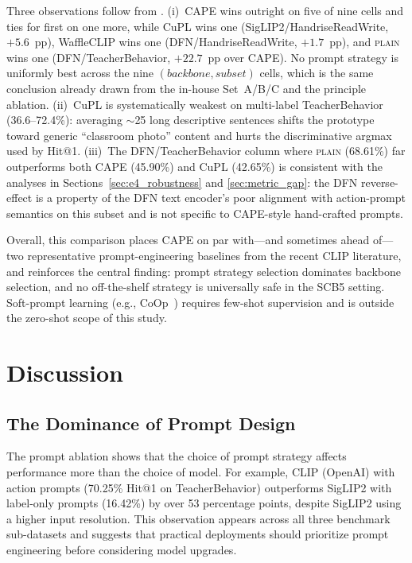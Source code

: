 \documentclass[electronics,article,submit,pdftex,moreauthors]{Definitions/mdpi}
\begin{document}
Three observations follow from . (i)~CAPE wins outright on five of nine cells and ties for first on one more, while CuPL wins one (SigLIP2/HandriseReadWrite, $+5.6$~pp), WaffleCLIP wins one (DFN/HandriseReadWrite, $+1.7$~pp), and \textsc{plain} wins one (DFN/TeacherBehavior, $+22.7$~pp over CAPE). No prompt strategy is uniformly best across the nine $(backbone, subset)$ cells, which is the same conclusion already drawn from the in-house Set~A/B/C and the principle ablation. (ii)~CuPL is systematically weakest on multi-label TeacherBehavior (36.6--72.4\%): averaging $\sim$25 long descriptive sentences shifts the prototype toward generic ``classroom photo'' content and hurts the discriminative argmax used by Hit@1. (iii)~The DFN/TeacherBehavior column where \textsc{plain} (68.61\%) far outperforms both CAPE (45.90\%) and CuPL (42.65\%) is consistent with the analyses in Sections~\ref{sec:e4_robustness} and \ref{sec:metric_gap}: the DFN reverse-effect is a property of the DFN text encoder's poor alignment with action-prompt semantics on this subset and is not specific to CAPE-style hand-crafted prompts.

Overall, this comparison places CAPE on par with---and sometimes ahead of---two representative prompt-engineering baselines from the recent CLIP literature, and reinforces the central finding: prompt strategy selection dominates backbone selection, and no off-the-shelf strategy is universally safe in the SCB5 setting. Soft-prompt learning (e.g., CoOp~\cite{zhou2022learning}) requires few-shot supervision and is outside the zero-shot scope of this study.


\section{Discussion}
\label{sec:discussion}

\subsection{The Dominance of Prompt Design}

The prompt ablation shows that the choice of prompt strategy affects performance more than the choice of model.
For example, CLIP (OpenAI) with action prompts (70.25\% Hit@1 on TeacherBehavior) outperforms SigLIP2 with label-only prompts (16.42\%) by over 53 percentage points, despite SigLIP2 using a higher input resolution.
This observation appears across all three benchmark sub-datasets and suggests that practical deployments should prioritize prompt engineering before considering model upgrades.
\end{document}

